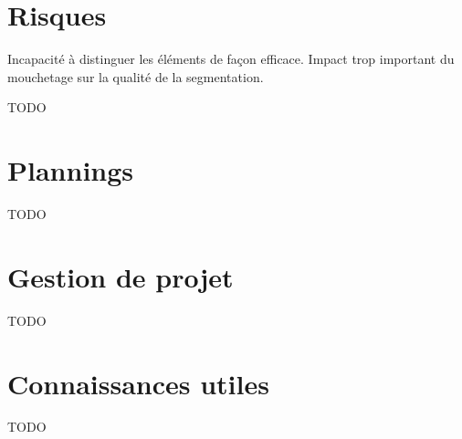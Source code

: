 \documentclass[12pt,titlepage,french]{article}
\begin{document}
\section{Risques}

Incapacité à distinguer les éléments de façon efficace.
Impact trop important du mouchetage sur la qualité de la segmentation.

TODO

\section{Plannings}

TODO

\section{Gestion de projet}

TODO

\section{Connaissances utiles}

TODO
\end{document}
